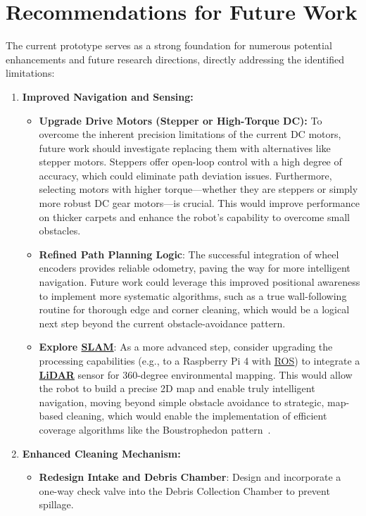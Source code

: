 \section{Recommendations for Future Work}
\label{sec:future_work_new}
The current prototype serves as a strong foundation for numerous potential enhancements and future research directions, directly addressing the identified limitations:
\begin{enumerate}
    \item \textbf{Improved Navigation and Sensing:}
        \begin{itemize}
            \item \textbf{Upgrade Drive Motors (Stepper or High-Torque DC):} To overcome the inherent precision limitations of the current DC motors, future work should investigate replacing them with alternatives like stepper motors. Steppers offer open-loop control with a high degree of accuracy, which could eliminate path deviation issues. Furthermore, selecting motors with higher torque—whether they are steppers or simply more robust DC gear motors—is crucial. This would improve performance on thicker carpets and enhance the robot's capability to overcome small obstacles.
            \item \textbf{Refined Path Planning Logic}: The successful integration of wheel encoders provides reliable odometry, paving the way for more intelligent navigation. Future work could leverage this improved positional awareness to implement more systematic algorithms, such as a true wall-following routine for thorough edge and corner cleaning, which would be a logical next step beyond the current obstacle-avoidance pattern.
            \item \textbf{Explore \hyperref[term:slam]{SLAM}}: As a more advanced step, consider upgrading the processing capabilities (e.g., to a Raspberry Pi 4 with \hyperref[term:ros]{ROS}) to integrate a \textbf{\hyperref[term:lidar]{LiDAR}} sensor for 360-degree environmental mapping. This would allow the robot to build a precise 2D map and enable truly intelligent navigation, moving beyond simple obstacle avoidance to strategic, map-based cleaning, which would enable the implementation of efficient coverage algorithms like the Boustrophedon pattern~\cite{DurrantWhyte2006SLAM}.
        \end{itemize}
    \item \textbf{Enhanced Cleaning Mechanism:}
        \begin{itemize}
            \item \textbf{Redesign Intake and Debris Chamber}: Design and incorporate a one-way check valve into the Debris Collection Chamber to prevent spillage.

\end{itemize}
\end{enumerate}
